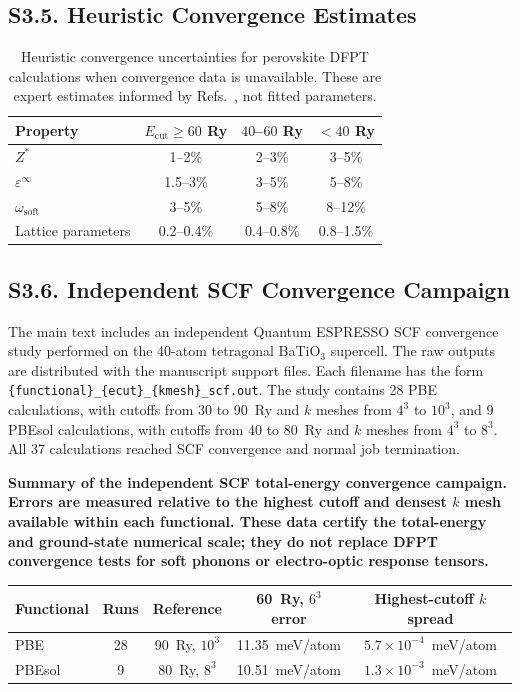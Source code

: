 ﻿\documentclass[prb,onecolumn,superscriptaddress,amsmath,amssymb,longbibliography]{revtex4-2}
\begin{document}
\subsection{S3.5. Heuristic Convergence Estimates}

\begin{table}[h]
\centering
\caption{Heuristic convergence uncertainties for perovskite DFPT
calculations when convergence data is unavailable. These are expert
estimates informed by Refs.~\cite{Ghosez1999,Wahl2008}, not fitted
parameters.}
\label{tab:si_heuristic}
\begin{tabular}{lccc}
\toprule
Property & $E_{\mathrm{cut}} \geq 60$ Ry & $40$--$60$ Ry & $< 40$ Ry \\
\midrule
$Z^*$ & 1--2\% & 2--3\% & 3--5\% \\
$\varepsilon^\infty$ & 1.5--3\% & 3--5\% & 5--8\% \\
$\omega_{\mathrm{soft}}$ & 3--5\% & 5--8\% & 8--12\% \\
Lattice parameters & 0.2--0.4\% & 0.4--0.8\% & 0.8--1.5\% \\
\bottomrule
\end{tabular}
\end{table}

\subsection{S3.6. Independent SCF Convergence Campaign}

The main text includes an independent Quantum ESPRESSO SCF convergence study
performed on the 40-atom tetragonal BaTiO$_3$ supercell. The raw outputs are
distributed with the manuscript support files. Each filename has the form
\texttt{\{functional\}\_\{ecut\}\_\{kmesh\}\_scf.out}. The study contains
28 PBE calculations, with cutoffs from 30 to 90~Ry and $k$ meshes from
$4^3$ to $10^3$, and 9 PBEsol calculations, with cutoffs from 40 to 80~Ry
and $k$ meshes from $4^3$ to $8^3$. All 37 calculations reached SCF
convergence and normal job termination.

\begin{center}
\textbf{Summary of the independent SCF total-energy convergence campaign.
Errors are measured relative to the highest cutoff and densest $k$ mesh
available within each functional. These data certify the total-energy and
ground-state numerical scale; they do not replace DFPT convergence tests for
soft phonons or electro-optic response tensors.}\\[0.5em]
\begin{tabular}{lcccc}
\toprule
Functional & Runs & Reference & 60~Ry, $6^3$ error & Highest-cutoff $k$ spread \\
\midrule
PBE & 28 & 90~Ry, $10^3$ & 11.35~meV/atom & $5.7\times10^{-4}$~meV/atom \\
PBEsol & 9 & 80~Ry, $8^3$ & 10.51~meV/atom & $1.3\times10^{-3}$~meV/atom \\
\bottomrule
\end{tabular}
\end{center}
\end{document}
